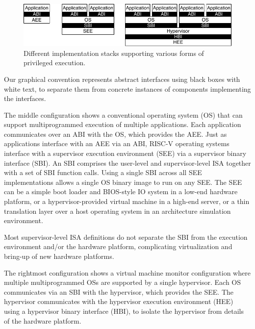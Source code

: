 \begin{figure}[th]
\centering
\includegraphics[width=\textwidth]{figs/privimps.pdf}
\caption{Different implementation stacks supporting various forms of
  privileged execution.}
\label{fig:privimps}
\end{figure}

\begin{commentary}
Our graphical convention represents abstract interfaces using black
boxes with white text, to separate them from concrete instances of
components implementing the interfaces.
\end{commentary}

The middle configuration shows a conventional operating system (OS)
that can support multiprogrammed execution of multiple
applications. Each application communicates over an ABI with the OS,
which provides the AEE.  Just as applications interface with an AEE
via an ABI, RISC-V operating systems interface with a supervisor
execution environment (SEE) via a supervisor binary interface (SBI).
An SBI comprises the user-level and supervisor-level ISA together with
a set of SBI function calls.  Using a single SBI across all SEE
implementations allows a single OS binary image to run on any SEE.
The SEE can be a simple boot loader and BIOS-style IO system in a
low-end hardware platform, or a hypervisor-provided virtual machine in
a high-end server, or a thin translation layer over a host operating
system in an architecture simulation environment.

\begin{commentary}
Most supervisor-level ISA definitions do not separate the SBI from the
execution environment and/or the hardware platform, complicating
virtualization and bring-up of new hardware platforms.
\end{commentary}

The rightmost configuration shows a virtual machine monitor
configuration where multiple multiprogrammed OSs are supported by a
single hypervisor.  Each OS communicates via an SBI with the
hypervisor, which provides the SEE.  The hypervisor communicates with
the hypervisor execution environment (HEE) using a hypervisor binary
interface (HBI), to isolate the hypervisor from details of the
hardware platform.

